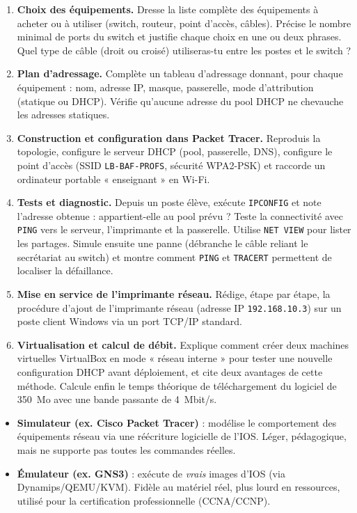 \documentclass[11pt]{article}
\newcounter{popsec}
\newcounter{popsub}
\newcommand{\courssub}[1]{%
  \stepcounter{popsub}%
  \par\vspace{9pt}\noindent{\popxbold\fontsize{11.5}{13}\selectfont\color{popink}{\color{poporange}\thepopsec.\thepopsub}\hspace{6pt}#1}\par\nopagebreak\vspace{4pt}
}
\begin{document}
\begin{enumerate}
\item \textbf{Choix des équipements.} Dresse la liste complète des équipements à acheter ou à utiliser (switch, routeur, point d'accès, câbles). Précise le nombre minimal de ports du switch et justifie chaque choix en une ou deux phrases. Quel type de câble (droit ou croisé) utiliseras-tu entre les postes et le switch ?
\item \textbf{Plan d'adressage.} Complète un tableau d'adressage donnant, pour chaque équipement : nom, adresse IP, masque, passerelle, mode d'attribution (statique ou DHCP). Vérifie qu'aucune adresse du pool DHCP ne chevauche les adresses statiques.
\item \textbf{Construction et configuration dans Packet Tracer.} Reproduis la topologie, configure le serveur DHCP (pool, passerelle, DNS), configure le point d'accès (SSID \texttt{LB-BAF-PROFS}, sécurité WPA2-PSK) et raccorde un ordinateur portable « enseignant » en Wi-Fi.
\item \textbf{Tests et diagnostic.} Depuis un poste élève, exécute \texttt{IPCONFIG} et note l'adresse obtenue : appartient-elle au pool prévu ? Teste la connectivité avec \texttt{PING} vers le serveur, l'imprimante et la passerelle. Utilise \texttt{NET VIEW} pour lister les partages. Simule ensuite une panne (débranche le câble reliant le secrétariat au switch) et montre comment \texttt{PING} et \texttt{TRACERT} permettent de localiser la défaillance.
\item \textbf{Mise en service de l'imprimante réseau.} Rédige, étape par étape, la procédure d'ajout de l'imprimante réseau (adresse IP \texttt{192.168.10.3}) sur un poste client Windows via un port TCP/IP standard.
\item \textbf{Virtualisation et calcul de débit.} Explique comment créer deux machines virtuelles VirtualBox en mode « réseau interne » pour tester une nouvelle configuration DHCP avant déploiement, et cite deux avantages de cette méthode. Calcule enfin le temps théorique de téléchargement du logiciel de \SI{350}{Mo} avec une bande passante de \SI{4}{Mbit/s}.
\end{enumerate}

\courssub{Ressources à mobiliser}

\begin{definition}
\begin{itemize}
\item \textbf{Simulateur (ex. Cisco Packet Tracer)} : modélise le comportement des équipements réseau via une réécriture logicielle de l'IOS. Léger, pédagogique, mais ne supporte pas toutes les commandes réelles.
\item \textbf{Émulateur (ex. GNS3)} : exécute de \emph{vrais} images d'IOS (via Dynamips/QEMU/KVM). Fidèle au matériel réel, plus lourd en ressources, utilisé pour la certification professionnelle (CCNA/CCNP).
\end{itemize}
\end{definition}
\end{document}
